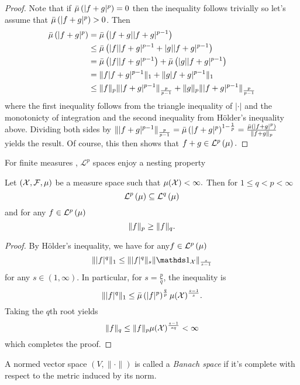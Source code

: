 \begin{proof}
Note that if $\bar{\mu}\left(\lvert f+g\rvert^{p}\right)=0$ then the inequality
follows trivially so let's assume that $\bar{\mu}\left(\lvert f+g\rvert^{p}\right)>0$.
Then
\begin{align*}
\bar{\mu}\left(\lvert f+g\lvert^{p}\right) & =\bar{\mu}\left(\lvert f+g\rvert\lvert f+g\rvert^{p-1}\right)\\
 & \leq\bar{\mu}\left(\lvert f\rvert\lvert f+g\rvert^{p-1}+\lvert g\rvert\lvert f+g\rvert^{p-1}\right)\\
 & =\bar{\mu}\left(\lvert f\rvert\lvert f+g\rvert^{p-1}\right)+\bar{\mu}\left(\lvert g\rvert\lvert f+g\rvert^{p-1}\right)\\
 & =\lVert f\lvert f+g\rvert^{p-1}\rVert_{1}+\lVert g\lvert f+g\rvert^{p-1}\rVert_{1}\\
 & \leq\lVert f\rVert_{p}\lVert\lvert f+g\rvert^{p-1}\rVert_{\frac{p}{p-1}}+\lVert g\rVert_{p}\lVert\lvert f+g\rvert^{p-1}\rVert_{\frac{p}{p-1}}
\end{align*}
where the first inequality follows from the triangle inequality of
$\lvert\cdot\rvert$ and the monotonicty of integration and the second
inequality from H\"{o}lder's inequality above. Dividing both sides
by $\lVert\lvert f+g\rvert^{p-1}\rVert_{\frac{p}{p-1}}=\bar{\mu}\left(\lvert f+g\rvert^{p}\right)^{1-\frac{1}{p}}=\frac{\bar{\mu}\left(\lvert f+g\lvert^{p}\right)}{\lVert f+g\rVert_{p}}$
yields the result. Of course, this then shows that $f+g\in\mathcal{L}^{p}\left(\mu\right).$
\end{proof}
For finite measures , $\mathcal{L}^{p}$ spaces enjoy a nesting property
\begin{prop}
\label{prop:nestingLpSpace}Let $(\mathcal{X},\mathcal{F},\mu)$ be a measure space
such that $\mu(\mathcal{X})<\infty.$ Then for $1\leq q<p<\infty$
\[
\mathcal{L}^{p}\left(\mu\right)\subseteq\mathcal{L}^{q}\left(\mu\right)
\]
and for any $f\in\mathcal{L}^{p}\left(\mu\right)$
\[
\lVert f\rVert_{p}\geq\lVert f\rVert_{q}.
\]
\end{prop}

\begin{proof}
By H\"{o}lder's inequality, we have for any$f\in\mathcal{L}^{p}\left(\mu\right)$
\[
\pnorm{\lvert f\rvert{}^{q}}1\leq\pnorm{\lvert f\rvert{}^{q}}s\pnorm{\indicate_{\X}}{\frac{s}{s-1}}
\]
for any $s\in(1,\infty)$. In particular, for $s=\frac{p}{q}$, the
inequality is
\[
\lVert\lvert f\rvert{}^{q}\rVert_{1}\leq\bar{\mu}\left(\lvert f\rvert^{p}\right)^{\frac{q}{p}}\mu(\mathcal{X})^{\frac{s-1}{s}}.
\]
Taking the $q$th root yields
\[
\lVert f\rVert_{q}\leq\lVert f\rVert_{p}\mu(\mathcal{X})^{\frac{s-1}{sq}}<\infty
\]
which completes the proof.
\end{proof}
\begin{defn}
\label{def:banachSpace}A normed vector space $\left(V,\|\cdot\|\right)$
is called a \emph{Banach space }if it's complete with respect to the
metric induced by its norm.
\end{defn}

